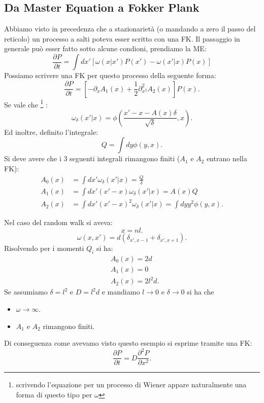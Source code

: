 \subsection{Da Master Equation a Fokker Plank}%
\label{sub:Da Master Equation a Fokker Plank}
Abbiamo visto in precedenza che a stazionarietà (o mandando a zero il passo del reticolo) un processo a salti poteva esser scritto con una FK. Il passaggio in generale può esser fatto sotto alcune condioni, prendiamo la ME:
\begin{equation}
    \frac{\partial P}{\partial t} = \int dx' \left[\omega (x|x') P(x') - \omega (x'|x) P(x) \right]
    \label{eq:13-ME_gen}
\end{equation}
Possiamo scrivere una FK per questo processo della seguente forma:
\[
    \frac{\partial P}{\partial t} = \left[-\partial_{x}A_1(x) + \frac{1}{2}\partial^2_{x^2} A_2(x) \right]P(x) 
.\] 
Se vale che
\footnote{scrivendo l'equazione per un processo di Wiener appare naturalmente una forma di questo tipo per $\omega$}
:
\[
    \omega_\delta (x'|x) = \phi	\left( \frac{x'-x - A(x)\delta}{\sqrt{\delta}}, x\right)
.\] 
Ed inoltre, definito l'integrale:
\[
    Q = \int dy \phi (y, x) 
.\] 
Si deve avere che i 3 seguenti integrali rimangono finiti ($A_1$ e $A_2$ entrano nella FK):
\[\begin{aligned}
    A_0(x)  &= \int dx'\omega_\delta (x'|x) = \frac{Q}{\delta}\\
    A_1(x) &= \int dx' (x'-x) \omega_\delta\left(x'|x\right) = A(x) Q\\
    A_2(x) &= \int dx'(x'-x)^2 \omega_\delta\left(x'|x\right) = \int dy y^2\phi (y,x) 
.\end{aligned}\]
\begin{exmp}
    Nel caso del random walk si aveva:
    \[
        x = nl
    .\]
    \[
	\omega (x,x') = d(\delta_{x',x-1} + \delta_{x',x+1}) 
    .\] 
    Risolvendo per i momenti $Q_i$ si ha:
    \[\begin{aligned}
	&A_0(x) = 2d\\
	&A_1(x) = 0\\
	&A_2(x) = 2l^2d
    .\end{aligned}\]
    Se assumiamo $\delta =l^2$ e $D = l^2d$ e mandiamo $l\to 0$ e $\delta\to 0$ si ha che
    \begin{itemize}
        \item $\omega\to \infty$.
	\item $A_1$ e $A_2$ rimangono finiti.
    \end{itemize}
    Di conseguenza come avevamo visto questo esempio si esprime tramite una FK:
    \[
        \frac{\partial P}{\partial t} = D\frac{\partial ^2P}{\partial x^2} 
    .\] 
\end{exmp}
